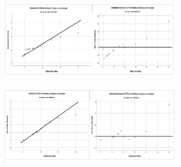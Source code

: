 \begin{figure}[h]
 \centering

     \begin{subfigure}{0.8\textwidth}
     \centering
         \includegraphics[width=\textwidth]{images/300.PNG}
                      \end{subfigure}
     \vspace{1cm}
     
     \begin{subfigure}{0.8\textwidth}
     \centering
         \includegraphics[width=\textwidth]{images/301.PNG}
             \end{subfigure}
\end{figure}

\clearpage

